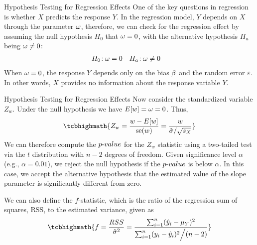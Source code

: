 %
%
\begin{frame}{Hypothesis Testing for Regression Effects}
One of the key questions in regression is whether $X$
predicts the response $Y$. In the regression model, 
$Y$ depends on $X$ through the parameter $\omega$, therefore, we can check
for the regression effect by 
assuming the null hypothesis $H_0$ that
$\omega=0$, with the alternative hypothesis $H_a$ being $\omega \ne 0$: 
\begin{align*}
    H_0\!: & \; \omega = 0 & H_a\!: & \; \omega \ne 0 
\end{align*}
When $\omega=0$, the response $Y$ depends only on the bias $\beta$ and the random
error $\varepsilon$. 
In other words, $X$ provides no information about the response
variable $Y$. 
\end{frame}
%
%
\begin{frame}{Hypothesis Testing for Regression Effects}
Now consider the standardized variable $Z_{w}$.%
Under
the null hypothesis we have $E[w] = \omega = 0$. Thus,
\begin{align}
    \tcbhighmath{
    Z_{w} = \frac{w - E[w]}{\se(w)} = \frac{w}{ \hsigma / \sqrt{s_X}} }
\end{align}
We can therefore compute the ${p\text{-}value}$ for the $Z_{w}$ statistic
using a two-tailed test via the $t$ distribution with $n-2$ degrees of freedom.
Given significance level $\alpha$ (e.g., $\alpha=0.01$),
we reject the null hypothesis if the ${p\text{-}value}$ is below $\alpha$.
In this case, we accept the
alternative hypothesis that the estimated value of the slope parameter
is significantly different from zero.

\medskip

We can also define the $f$-statistic, which is the ratio of the
regression sum of squares, RSS, to
the estimated variance, given as
\begin{align}
    \tcbhighmath{
    f = \frac{RSS}{\hsigma^2} 
    = \frac{\sum_{i=1}^n (\hy_i - \mu_Y)^2}{\sum_{i=1}^n (y_i -
\hy_i)^2 \Big/ (n-2)}}
\end{align}
\end{frame}

